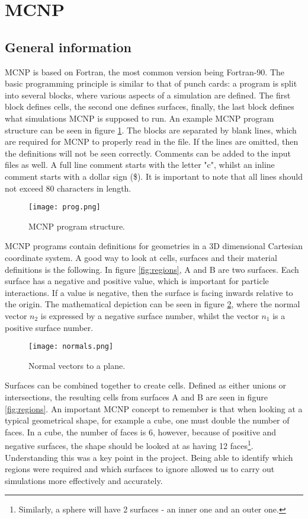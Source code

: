 \label{sec:mcnp}
\section{MCNP}
\subsection{General information}
MCNP is based on Fortran, the most common version being Fortran-90. The basic programming principle is similar to that of punch cards: a program is split into several blocks, where various aspects of a simulation are defined. The first block defines cells, the second one defines surfaces, finally, the last block defines what simulations MCNP is supposed to run. An example MCNP program structure can be seen in figure \ref{fig:program}. The blocks are separated by blank lines, which are required for MCNP to properly read in the file. If the lines are omitted, then the definitions will not be seen correctly. Comments can be added to the input files as well. A full line comment starts with the letter "c", whilst an inline comment starts with a dollar sign (\$). It is important to note that all lines should not exceed 80 characters in length.

\begin{figure}[!htbp]
\caption{MCNP program structure.}
\label{fig:program}
\centering
\texttt{[image: prog.png]}
\end{figure}

MCNP programs contain definitions for geometries in a 3D dimensional Cartesian coordinate system. A good way to look at cells, surfaces and their material definitions is the following. In figure \ref{fig:regions}, A and B are two surfaces. Each surface has a negative and positive value, which is important for particle interactions. If a value is negative, then the surface is facing inwards relative to the origin. The mathematical depiction can be seen in figure \ref{fig:planes}, where the normal vector $n_2$ is expressed by a negative surface number, whilst the vector $n_1$ is a positive surface number.

\begin{figure}[!htbp]
\caption{Normal vectors to a plane.}
\label{fig:planes}
\centering
\texttt{[image: normals.png]}
\end{figure}

Surfaces can be combined together to create cells. Defined as either unions or intersections, the resulting cells from surfaces A and B are seen in figure \ref{fig:regions}. An important MCNP concept to remember is that when looking at a typical geometrical shape, for example a cube, one must double the number of faces. In a cube, the number of faces is 6, however, because of positive and negative surfaces, the shape should be looked at as having 12 faces\footnote{Similarly, a sphere will have 2 surfaces - an inner one and an outer one.}. Understanding this was a key point in the project. Being able to identify which regions were required and which surfaces to ignore allowed us to carry out simulations more effectively and accurately.

